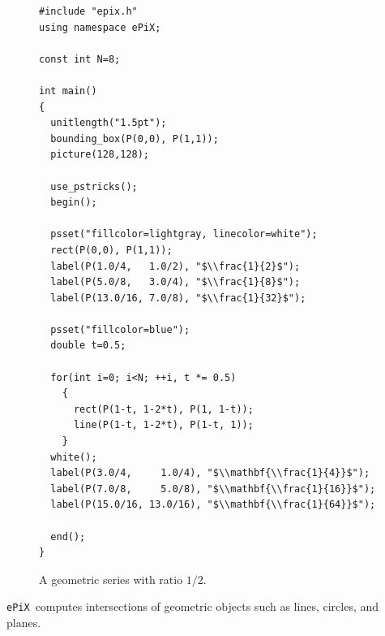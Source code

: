 \documentclass[11pt]{article}
\newcommand{\ePiX}{\texttt{ePiX}}
\begin{document}
\begin{figure}[hbt]
\begin{center}

\vspace*{-192pt}
\begin{verbatim}
#include "epix.h"
using namespace ePiX;

const int N=8;

int main() 
{
  unitlength("1.5pt");
  bounding_box(P(0,0), P(1,1));
  picture(128,128);

  use_pstricks();
  begin();

  psset("fillcolor=lightgray, linecolor=white");
  rect(P(0,0), P(1,1));
  label(P(1.0/4,   1.0/2), "$\\frac{1}{2}$");
  label(P(5.0/8,   3.0/4), "$\\frac{1}{8}$");
  label(P(13.0/16, 7.0/8), "$\\frac{1}{32}$");

  psset("fillcolor=blue");
  double t=0.5;

  for(int i=0; i<N; ++i, t *= 0.5)
    {
      rect(P(1-t, 1-2*t), P(1, 1-t));
      line(P(1-t, 1-2*t), P(1-t, 1));
    }
  white();
  label(P(3.0/4,     1.0/4), "$\\mathbf{\\frac{1}{4}}$");
  label(P(7.0/8,     5.0/8), "$\\mathbf{\\frac{1}{16}}$");
  label(P(15.0/16, 13.0/16), "$\\mathbf{\\frac{1}{64}}$");

  end();
}
\end{verbatim}
\caption{A geometric series with ratio $1/2$.}
\label{fig:geomsum}
\end{center}
\end{figure}

\clearpage

\noindent \ePiX\ computes intersections of geometric objects such as lines,
circles, and planes.
\end{document}
